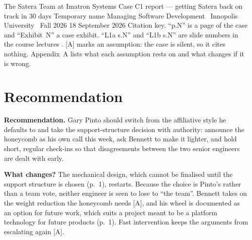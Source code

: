 \documentclass[oneside,final,11pt,letterpaper]{article}
\begin{document}
\begin{coursereporttitle}
  {The Satera Team at Imatron Systems}
  {Case C1 report --- getting Satera back on track in 30 days}
  {Temporary name}
  {%
  }
  {Managing Software Development \textperiodcentered\ Innopolis University \textperiodcentered\ Fall 2026}
  {18 September 2026}
Citation key. ``p.N'' is a page of the case \parencite{amabile2003satera} and ``Exhibit~N'' a case exhibit. ``L1a s.N'' and ``L1b s.N'' are slide numbers in the course lectures \parencite{sadovykh2026l1a,sadovykh2026l1b}. [A] marks an assumption: the case is silent, so it cites nothing. Appendix~A lists what each assumption rests on and what changes if it is wrong.
\end{coursereporttitle}

\section{Recommendation}
\textbf{Recommendation.}
Gary Pinto should switch from the affiliative style he defaults to and take the support-structure decision with authority: announce the honeycomb as his own call this week, ask Bennett to make it lighter, and hold short, regular check-ins so that disagreements between the two senior engineers are dealt with early.

\textbf{What changes?}
The mechanical design, which cannot be finalised until the support structure is chosen (p.~1), restarts. Because the choice is Pinto's rather than a team vote, neither engineer is seen to lose to ``the team''. Bennett takes on the weight reduction the honeycomb needs [A], and his wheel is documented as an option for future work, which suits a project meant to be a platform technology for future products (p.~1). Fast intervention keeps the arguments from escalating again [A].
\end{document}
